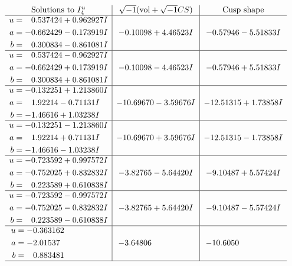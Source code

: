 \documentclass[1p]{elsarticle_modified}
\theoremstyle{definition}
\newcommand{\I}{\sqrt{-1}}
\begin{document}
$$\begin{array}{c|c|c}  
\text{Solutions to }I^u_{4}& \I (\text{vol} + \sqrt{-1}CS) & \text{Cusp shape}\\
 \hline 
\begin{aligned}
u &= \phantom{-}0.537424 + 0.962927 I \\
a &= -0.662429 - 0.173919 I \\
b &= \phantom{-}0.300834 - 0.861081 I\end{aligned}
 & -0.10098 + 4.46523 I & -0.57946 - 5.51833 I \\ \hline\begin{aligned}
u &= \phantom{-}0.537424 - 0.962927 I \\
a &= -0.662429 + 0.173919 I \\
b &= \phantom{-}0.300834 + 0.861081 I\end{aligned}
 & -0.10098 - 4.46523 I & -0.57946 + 5.51833 I \\ \hline\begin{aligned}
u &= -0.132251 + 1.213860 I \\
a &= \phantom{-}1.92214 - 0.71131 I \\
b &= -1.46616 + 1.03238 I\end{aligned}
 & -10.69670 - 3.59676 I & -12.51315 + 1.73858 I \\ \hline\begin{aligned}
u &= -0.132251 - 1.213860 I \\
a &= \phantom{-}1.92214 + 0.71131 I \\
b &= -1.46616 - 1.03238 I\end{aligned}
 & -10.69670 + 3.59676 I & -12.51315 - 1.73858 I \\ \hline\begin{aligned}
u &= -0.723592 + 0.997572 I \\
a &= -0.752025 + 0.832832 I \\
b &= \phantom{-}0.223589 + 0.610838 I\end{aligned}
 & -3.82765 - 5.64420 I & -9.10487 + 5.57424 I \\ \hline\begin{aligned}
u &= -0.723592 - 0.997572 I \\
a &= -0.752025 - 0.832832 I \\
b &= \phantom{-}0.223589 - 0.610838 I\end{aligned}
 & -3.82765 + 5.64420 I & -9.10487 - 5.57424 I \\ \hline\begin{aligned}
u &= -0.363162\phantom{ +0.000000I} \\
a &= -2.01537\phantom{ +0.000000I} \\
b &= \phantom{-}0.883481\phantom{ +0.000000I}\end{aligned}
 & -3.64806\phantom{ +0.000000I} & -10.6050\phantom{ +0.000000I}\\
 \hline 
 \end{array}$$\newpage\newpage\renewcommand{\arraystretch}{1}
\end{document}
